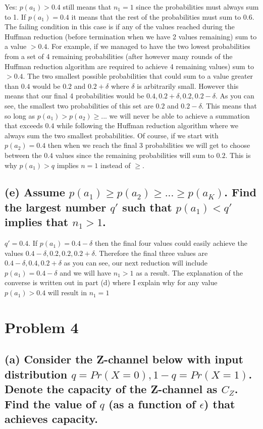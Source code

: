 \documentclass[11pt, oneside]{book}   	%
\begin{document}
Yes: $p(a_1)>0.4$ still means that $n_1=1$ since the probabilities must always sum to 1.  If $p(a_1)=0.4$ it means that the rest of the probabilities must sum to $0.6$. The failing condition in this case is if any of the values reached during the Huffman reduction (before termination when we have 2 values remaining) sum to a value $>0.4$.  For example, if we managed to have the two lowest probabilities from a set of 4 remaining probabilities (after however many rounds of the Huffman reduction algorithm are required to achieve 4 remaining values) sum to $>0.4$.  The two smallest possible probabilities that could sum to a value greater than $0.4$ would be $0.2$ and $0.2+\delta$ where $\delta$ is arbitrarily small.  However this means that our final 4 probabilities would be $0.4, 0.2+\delta, 0.2, 0.2-\delta$.  As you can see, the smallest two probabilities of this set are $0.2$ and $0.2-\delta$.  This means that so long as $p(a_1)>p(a_2)\geq ...$ we will never be able to achieve a summation that exceeds $0.4$ while following the Huffman reduction algorithm where we always sum the two smallest probabilities.  Of course, if we start with $p(a_2)=0.4$ then when we reach the final 3 probabilities we will get to choose between the $0.4$ values since the remaining probabilities will sum to $0.2$.  This is why $p(a_1)>q$ implies $n=1$ instead of $\geq$.

\subsection*{(e) Assume $p(a_1) \geq p(a_2) \geq ... \geq p(a_K)$. Find the largest number $q'$ such that $p(a_1) < q'$ implies that $n_1 > 1$.}

$q'=0.4$.  If $p(a_1)=0.4-\delta$ then the final four values could easily achieve the values $0.4-\delta, 0.2, 0.2, 0.2+\delta$.  Therefore the final three values are $0.4-\delta, 0.4, 0.2+\delta$ as you can see, our next reduction will include $p(a_1)=0.4-\delta$ and we will have $n_1>1$ as a result.  The explanation of the converse is written out in part (d) where I explain why for any value $p(a_1)>0.4$ will result in $n_1=1$



\section{Problem 4}
\subsection*{(a) Consider the Z-channel below with input distribution $q = Pr(X=0), 1-q=Pr(X=1)$. Denote the capacity of the Z-channel as $C_Z$.  Find the value of $q$ (as a function of $\epsilon$) that achieves capacity.}
\end{document}
